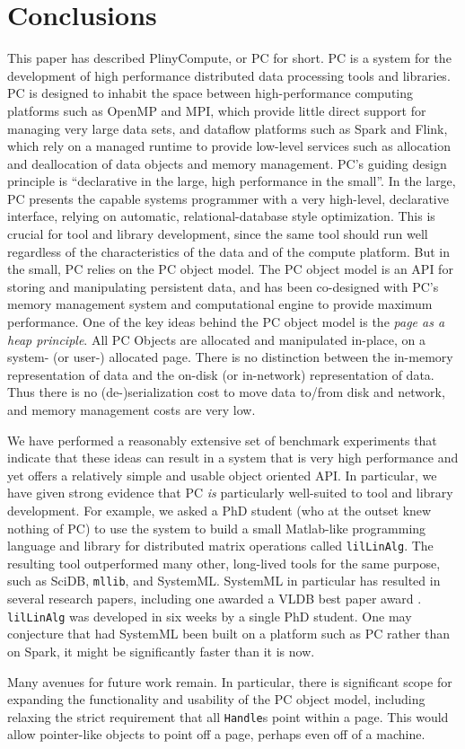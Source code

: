 
\section{Conclusions}
\label{sec:conc}
This paper has described PlinyCompute, or PC for short.  PC is a system for the development of high performance
distributed data processing tools and libraries.  PC is designed to inhabit the space between
high-performance computing platforms such as OpenMP and MPI, which provide little direct support
for managing very large data sets, and dataflow platforms such as Spark and Flink, which rely on 
a managed runtime to provide low-level services such as allocation and deallocation of data objects and memory management.
PC's guiding design principle is ``declarative in the large,
high performance in the small''.
In the large, PC presents the capable systems programmer with a very high-level, declarative interface, relying on automatic,
relational-database style optimization.  This is crucial for tool and library development, since the same tool should run well
regardless of the characteristics of the data and of the compute platform.  But in the small, PC relies on the PC object model.
The PC object model is an
API for storing and manipulating persistent data, and has been co-designed with PC's memory management
system and computational engine to provide maximum performance.
One of the key ideas behind the PC object model is the \emph{page as a heap principle}. All PC
Objects are allocated and manipulated in-place, on a system- (or user-) allocated page. There is no distinction
between the in-memory representation of data and the on-disk (or in-network) representation of data.
Thus there is no (de-)serialization cost to move data to/from disk and network, and memory management
costs are very low.

We have performed a reasonably extensive set of benchmark experiments that indicate that these ideas can result in 
a system that is very high performance and yet offers a relatively simple and usable object oriented API.  In particular, 
we have given strong evidence that PC \emph{is} particularly well-suited to tool and library development. 
For example, we asked a PhD
student (who at the outset knew nothing of PC) to use the system to build a small Matlab-like programming
language and library for distributed matrix operations called
\texttt{lilLinAlg}.  The resulting tool outperformed many other, long-lived tools
for the same purpose, such as SciDB, \texttt{mllib}, and SystemML.  SystemML in particular has resulted 
in several research papers,
including one awarded a VLDB best paper award \cite{boehm2016systemml}.
\texttt{lilLinAlg} was developed in six weeks by a single PhD student.
One may conjecture that had SystemML been built on a platform such as PC rather than on Spark, it might be significantly
faster than it is now.

Many avenues for future work remain.  In particular, there is significant scope for expanding the functionality and
usability of the PC object model, including relaxing the strict requirement that all \texttt{Handle}s point within a page.  This
would allow pointer-like objects to point off a page, perhaps even off of a machine.  
